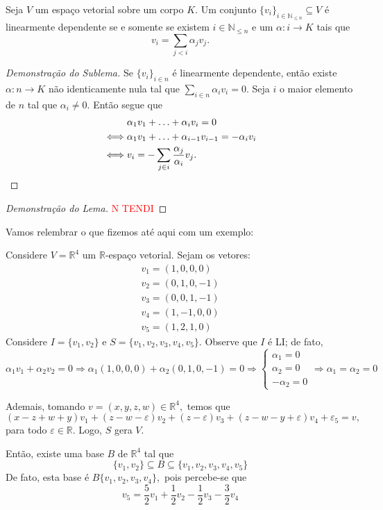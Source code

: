 \documentclass[11pt,twoside,a4paper]{book}
\begin{document}
\begin{sublema} Seja \(V\) um espaço vetorial sobre um corpo \(K\).
Um conjunto $\{v_i\}_{i \in \mathbb{N}_{\le n}}\subseteq V$ é linearmente dependente se e somente se existem $i\in  \mathbb{N}_{\le n}$ e um $\alpha: i\rightarrow K$ tais que \[v_i=\sum\limits_{j <i}\alpha_jv_j.\]
\end{sublema}
\begin{proof}[Demonstração do Sublema]
Se $\{v_i\}_{i\in n}$ é linearmente dependente, então existe
$\alpha:n\rightarrow K$ não identicamente nula  tal que  $\sum_{i\in
  n}\alpha_iv_i=0$. Seja $i$ o maior elemento de $n$ tal que $\alpha_i\neq 0$.
Então segue que
\begin{align*}
&\alpha_1 v_1 + \ldots + \alpha_i v_i = 0 \\ \iff &  \alpha_1v_1 + \ldots + \alpha_{i-1} v_{i-1} = - \alpha_i v_i \\ \iff &
v_i= - \sum\limits_{j\in i}\frac{\alpha_j}{\alpha_i}v_j.\qedhere
\end{align*}
\end{proof}
\begin{proof}[Demonstração do Lema]
\textcolor{red}{N TENDI}
\end{proof}
Vamos relembrar o que fizemos até aqui com um exemplo:
\begin{exemplo}
Considere $V = \mathbb{R}^4$ um $\mathbb{R}$-espaço vetorial. Sejam os vetores:
\[
\begin{array}{l}
v_1 = (1,0,0,0) \\
v_2 = (0,1,0,-1) \\
v_3 = (0,0,1,-1) \\
v_4 = (1,-1,0,0) \\
v_5 = (1,2,1,0) 
\end{array}
\]
Considere $I = \{ v_1, v_2 \}$ e $S  =\{ v_1,v_2,v_3,v_4,v_5 \}.$ Observe que $I$ é LI; de fato,
\[
\alpha_1v_1 + \alpha_2v_2 = 0 \Rightarrow \alpha_1(1,0,0,0) + \alpha_2 (0,1,0,-1) = 0 \Rightarrow \left\{ \begin{array}{l} \alpha_1 = 0 \\ \alpha_2 = 0 \\ - \alpha_2 = 0 \end{array} \right. \Rightarrow \alpha_1 = \alpha_2 = 0
\]

Ademais, tomando $v = (x,y,z,w) \in \mathbb{R}^4,$ temos que
\[
(x-z+w+y)v_1 + (z- w - \varepsilon)v_2 + (z - \varepsilon)v_3 + (z-w-y + \varepsilon)v_4 + \varepsilon_5 = v,
\]
para todo $\varepsilon \in \mathbb{R}.$ Logo, $S$ gera $V.$ 

Então, existe uma base $B$ de $\mathbb{R}^4$ tal que 
\[
\{ v_1, v_2 \} \subseteq B \subseteq \{v_1,v_2,v_3,v_4,v_5 \}
\]
De fato, esta base é $B \{v_1, v_2, v_3, v_4 \},$ pois percebe-se que
\[
v_5 = \frac{5}{2}v_1 + \frac{1}{2} v_2 - \frac{1}{2}v_3 - \frac{3}{2} v_4
\]
\end{exemplo}
\end{document}
